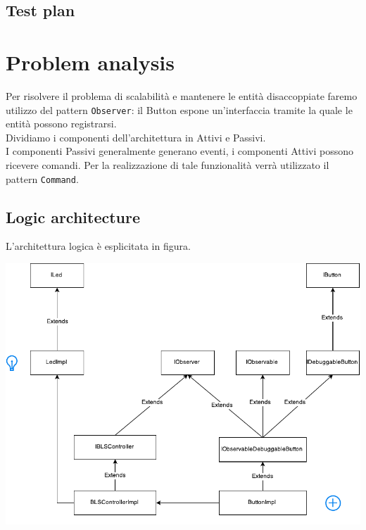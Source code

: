 \documentclass{llncs}
\newcommand{\labelsec}[1]{\label{sec:#1}}
\begin{document}
\subsection{Test plan}
\labelsec{Test plan}
\section{Problem analysis}
\labelsec{ProblemAnalysis}
Per risolvere il problema di scalabilit\`a e mantenere le entit\`a disaccoppiate faremo utilizzo del pattern \texttt{Observer}: il Button espone un'interfaccia tramite la quale le entit\`a possono registrarsi.\\
Dividiamo i componenti dell'architettura in Attivi e Passivi.\\
I componenti Passivi generalmente generano eventi, i componenti Attivi possono ricevere comandi. Per la realizzazione di tale funzionalit\`a verr\`a utilizzato il pattern \texttt{Command}.\\
\subsection{Logic architecture}
L'architettura logica \`e esplicitata in figura.
\begin{center}
\includegraphics{img/graphs/Analisi_BLS.pdf}
\end{center}
\begin{center}
\end{center}
\end{document}
